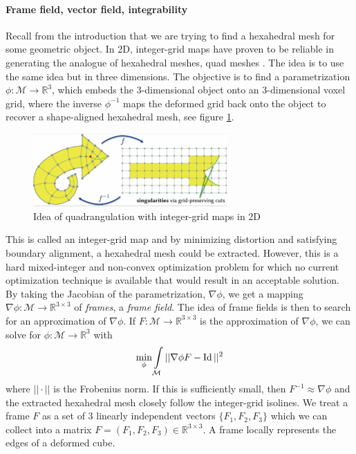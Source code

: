 \documentclass[../thesis.tex]{subfiles}
\begin{document}
\paragraph{Frame field, vector field, integrability}
Recall from the introduction that we are trying to find a hexahedral mesh
for some geometric object. In 2D, integer-grid maps have proven to be reliable
in generating the analogue of hexahedral meshes, quad meshes \cite{integer-grid}.
The idea is to use the same idea but in three dimensions.
The objective is to find a parametrization
$\phi : \mathcal{M} \to \mathbb{R}^3$, which embeds the $3$-dimensional object
onto an $3$-dimensional voxel grid, where the inverse $\phi^{-1}$ maps the deformed
grid back onto the object to recover a shape-aligned hexahedral mesh, see figure \ref{fig:integer-grid}.
\begin{figure}[htb]
  \centering
  \includegraphics[width=20em]{figures/integer-grid-rough}
  \caption{Idea of quadrangulation with integer-grid maps in 2D}
  \label{fig:integer-grid}
\end{figure}
This is called an integer-grid map and by minimizing distortion and satisfying boundary alignment,
a hexahedral mesh could be extracted.
However, this is a hard mixed-integer and non-convex optimization problem for which no current
optimization technique is available that would result in an acceptable solution.
By taking the Jacobian of the parametrization, $\nabla \phi$, we get a mapping
$\nabla \phi : \mathcal{M} \to \mathbb{R}^{3\times3}$ of \emph{frames}, a \emph{frame field}.
The idea of frame fields is then to search for an approximation of $\nabla \phi$.
If $F: \mathcal{M} \to \mathbb{R}^{3\times3}$ is the approximation of $\nabla \phi$, we can
solve for $\phi : \mathcal{M} \to \mathbb{R}^3$ with
$$\min \limits_{\phi} \int \limits_{\mathcal{M}} ||\nabla \phi F - \operatorname{Id}||^2$$
where $||\cdot||$ is the Frobenius norm. If this is sufficiently small, then $F^{-1} \approx \nabla \phi$ and 
the extracted hexahedral mesh closely follow the integer-grid isolines.
We treat a frame $F$ as a set of 3 linearly independent vectors $\{F_1,F_2,F_3 \}$ which we can
collect into a matrix $F=(F_1,F_2,F_3) \in \mathbb{R}^{3\times 3}$.
A frame locally represents the edges of a deformed cube.
\end{document}
